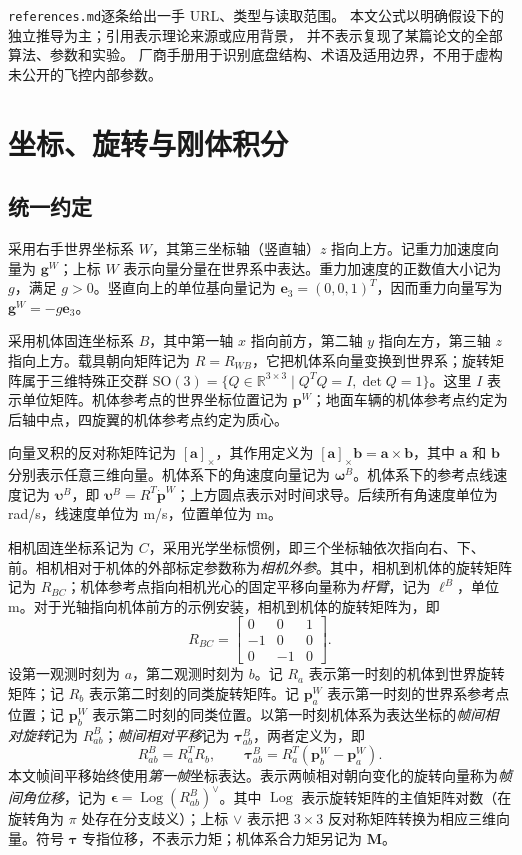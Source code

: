 \documentclass[UTF8,a4paper,fontset=fandol,11pt]{ctexart}
\newcommand{\R}{\mathbb{R}}
\newcommand{\SO}{\mathrm{SO}(3)}
\newcommand{\sk}[1]{[#1]_{\times}}
\newcommand{\e}{\bm e}
\newcommand{\vct}[1]{\bm #1}
\begin{document}
\texttt{references.md}逐条给出一手 URL、类型与读取范围。
本文公式以明确假设下的独立推导为主；引用表示理论来源或应用背景，
并不表示复现了某篇论文的全部算法、参数和实验。
厂商手册用于识别底盘结构、术语及适用边界，不用于虚构未公开的飞控内部参数。

\section{坐标、旋转与刚体积分}
\subsection{统一约定}
采用右手世界坐标系 $W$，其第三坐标轴（竖直轴）$z$ 指向上方。记重力加速度向量为 $\vct g^W$；上标 $W$ 表示向量分量在世界系中表达。重力加速度的正数值大小记为 $g$，满足 $g>0$。竖直向上的单位基向量记为 $\e_3=(0,0,1)^T$，因而重力向量写为 $\vct g^W=-g\e_3$。

采用机体固连坐标系 $B$，其中第一轴 $x$ 指向前方，第二轴 $y$ 指向左方，第三轴 $z$ 指向上方。载具朝向矩阵记为 $R=R_{WB}$，它把机体系向量变换到世界系；旋转矩阵属于三维特殊正交群 $\SO=\{Q\in\R^{3\times3}\mid Q^TQ=I,\det Q=1\}$。这里 $I$ 表示单位矩阵。机体参考点的世界坐标位置记为 $\vct p^W$；地面车辆的机体参考点约定为后轴中点，四旋翼的机体参考点约定为质心。

向量叉积的反对称矩阵记为 $\sk{\vct a}$，其作用定义为 $\sk{\vct a}\vct b=\vct a\times\vct b$，其中 $\vct a$ 和 $\vct b$ 分别表示任意三维向量。机体系下的角速度向量记为 $\vct\omega^B$。机体系下的参考点线速度记为 $\vct\upsilon^B$，即 $\vct\upsilon^B=R^T\dot{\vct p}^W$；上方圆点表示对时间求导。后续所有角速度单位为 rad/s，线速度单位为 m/s，位置单位为 m。

相机固连坐标系记为 $C$，采用光学坐标惯例，即三个坐标轴依次指向右、下、前。相机相对于机体的外部标定参数称为\emph{相机外参}。其中，相机到机体的旋转矩阵记为 $R_{BC}$；机体参考点指向相机光心的固定平移向量称为\emph{杆臂}，记为 $\vct\ell^B$，单位 m。对于光轴指向机体前方的示例安装，相机到机体的旋转矩阵为，即
\begin{equation}
 R_{BC}=\begin{bmatrix}0&0&1\\-1&0&0\\0&-1&0\end{bmatrix}.
\end{equation}
设第一观测时刻为 $a$，第二观测时刻为 $b$。记 $R_a$ 表示第一时刻的机体到世界旋转矩阵；记 $R_b$ 表示第二时刻的同类旋转矩阵。记 $\vct p_a^W$ 表示第一时刻的世界系参考点位置；记 $\vct p_b^W$ 表示第二时刻的同类位置。以第一时刻机体系为表达坐标的\emph{帧间相对旋转}记为 $R_{ab}^B$；\emph{帧间相对平移}记为 $\vct\tau_{ab}^B$，两者定义为，即
\begin{equation}\label{eq:relative}
 R_{ab}^{B}=R_a^TR_b,\qquad
 \vct\tau_{ab}^{B}=R_a^T(\vct p_b^W-\vct p_a^W).
\end{equation}
本文帧间平移始终使用\emph{第一帧}坐标表达。表示两帧相对朝向变化的旋转向量称为\emph{帧间角位移}，记为 $\vct\epsilon=\operatorname{Log}(R_{ab}^{B})^\vee$。其中 $\operatorname{Log}$ 表示旋转矩阵的主值矩阵对数（在旋转角为 $\pi$ 处存在分支歧义）；上标 $\vee$ 表示把 $3\times3$ 反对称矩阵转换为相应三维向量。符号 $\vct\tau$ 专指位移，不表示力矩；机体系合力矩另记为 $\vct M$。
\end{document}
